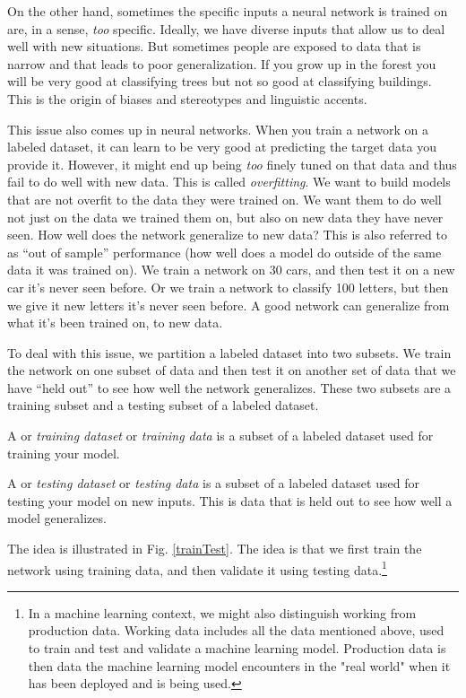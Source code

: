 On the other hand, sometimes the specific inputs a neural network is trained on are, in a sense, \emph{too} specific. Ideally, we have diverse inputs that allow us to deal well with new situations. But sometimes people are exposed to  data that is narrow and that leads to poor generalization. If you grow up in the forest you will be very good at classifying trees but not so good at classifying buildings. This is the origin of biases and stereotypes and linguistic accents. 

This issue also comes up in neural networks. When you train a network on a labeled dataset, it can learn to be very good at predicting the target data you provide it. However, it might end up being \emph{too} finely tuned on that data and thus fail to do well with new data. This is called \emph{overfitting}. We want to build models that are not overfit to the data they were trained on. We want them to do well not just on the data we trained them on, but also on new data they have never seen. How well does the network generalize to new data?  This is also referred to as ``out of sample'' performance (how well does a model do outside of the same data it was trained on). We train a network on 30 cars, and then test it on a new car it's never seen before. Or we train a network to classify 100 letters, but then we give it new letters it's never seen before. A good network can generalize from what it's been trained on, to new data.

To deal with this issue, we partition a labeled dataset into two subsets. We train the network on one subset of data and then test it on another set of data that we have ``held out'' to see how well the network generalizes. These two subsets are a training subset and a testing subset of a labeled dataset.

A  or \emph{training dataset} or \emph{training data} is a subset of a labeled dataset used for training your model.

A   or \emph{testing dataset} or \emph{testing data} is a subset of a labeled dataset used for testing your model on new inputs. This is data that is held out to see how well a model generalizes. 

The idea is illustrated in Fig. \ref{trainTest}. The idea is that we first train the network using training data, and then validate it using testing data.\footnote{In a machine learning context, we might also distinguish working from production data. Working data includes all the data mentioned above, used to train and test and validate a machine learning model. Production data is then data the machine learning model encounters in the "real world" when it has been deployed and is being used.} 

